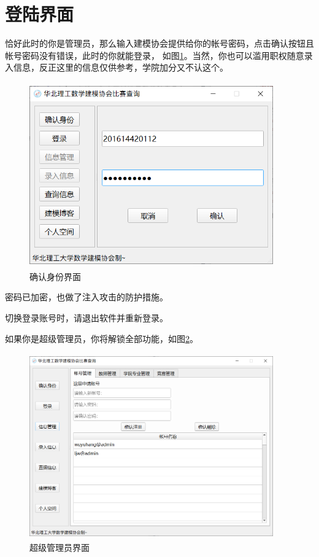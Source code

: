 \documentclass[cn, 11pt, chinese, show]{elegantbook}
\begin{document}
\section{登陆界面}

恰好此时的你是管理员，那么输入建模协会提供给你的帐号密码，点击确认按钮且帐号密码没有错误，此时的你就能登录，
如图\ref{fig:login}。当然，你也可以滥用职权随意录入信息，反正这里的信息仅供参考，学院加分又不认这个。

\begin{figure}[h]
    \centering
    \includegraphics[width=10.5cm, height=8cm]{figure/3.png}
    \caption{确认身份界面}
    \label{fig:login}
\end{figure}

\begin{remark}
密码已加密，也做了注入攻击的防护措施。
\end{remark}

\begin{remark}
切换登录账号时，请退出软件并重新登录。
\end{remark}

\newpage

如果你是超级管理员，你将解锁全部功能，如图\ref{fig:superadmin}。

\begin{figure}[h]
    \centering
    \includegraphics[width=10.5cm, height=8cm]{figure/4.png}
    \caption{超级管理员界面}
    \label{fig:superadmin}
\end{figure}
\end{document}
